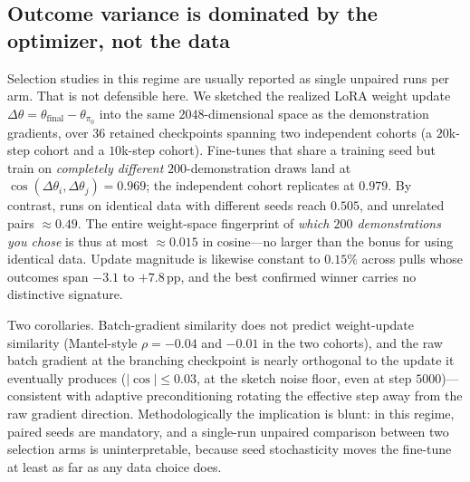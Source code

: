 \subsection{Outcome variance is dominated by the optimizer, not the data}
\label{sec:grad_q5}
Selection studies in this regime are usually reported as single unpaired runs
per arm. That is not defensible here. We sketched the realized LoRA weight
update $\Delta\theta = \theta_{\text{final}}-\theta_{\pi_0}$ into the same
$2048$-dimensional space as the demonstration gradients, over $36$ retained
checkpoints spanning two independent cohorts (a $20$k-step cohort and a
$10$k-step cohort). Fine-tunes that share a training seed but train on
\emph{completely different} $200$-demonstration draws land at
$\cos(\Delta\theta_i,\Delta\theta_j) = 0.969$; the independent cohort replicates
at $0.979$. By contrast, runs on identical data with different seeds reach
$0.505$, and unrelated pairs $\approx$$0.49$. The entire weight-space
fingerprint of \emph{which $200$ demonstrations you chose} is thus at most
$\approx$$0.015$ in cosine---no larger than the bonus for using identical data.
Update magnitude is likewise constant to $0.15\%$ across pulls whose outcomes
span $-3.1$ to $+7.8$\,pp, and the best confirmed winner carries no distinctive
signature.

Two corollaries. Batch-gradient similarity does not predict weight-update
similarity (Mantel-style $\rho = -0.04$ and $-0.01$ in the two cohorts), and the
raw batch gradient at the branching checkpoint is nearly orthogonal to the update
it eventually produces ($|\cos|\leq0.03$, at the sketch noise floor, even at step
$5000$)---consistent with adaptive preconditioning rotating the effective step
away from the raw gradient direction. Methodologically the implication is blunt:
in this regime, paired seeds are mandatory, and a single-run unpaired comparison
between two selection arms is uninterpretable, because seed stochasticity moves
the fine-tune at least as far as any data choice does.

